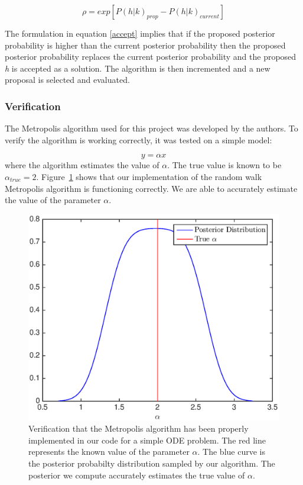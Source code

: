 \begin{equation}\label{accept}
\rho = exp[P(h|%
k)_{prop} - P(h|%
k)_{current}]
\end{equation}

The formulation in equation \ref{accept} implies that if the proposed posterior probability is higher than the current posterior probability then the proposed posterior probability replaces the current posterior probability and the proposed \textit{h} is accepted as a solution. The algorithm is then incremented and a new proposal is selected and evaluated. 


\subsubsection{Verification}
The Metropolis algorithm used for this project was developed by the authors. To verify the algorithm is working correctly, it was tested on a simple model:

\begin{equation}
y = \alpha x 
\end{equation}
where the algorithm estimates the value of $\alpha$. The true value is known to be $\alpha_{true}=2$. Figure~\ref{verifymcmc} shows that our implementation of the random walk Metropolis algorithm is functioning correctly. We are able to accurately estimate the value of the parameter $\alpha$. 

\begin{figure}[H]
\center
\includegraphics[scale=0.46]{img/MCMC-verification}
\caption{Verification that the Metropolis algorithm has been properly implemented in our code for a simple ODE problem. The red line represents the known value of the parameter $\alpha$. The blue curve is the posterior probabilty distribution sampled by our algorithm. The posterior we compute accurately estimates the true value of $\alpha$.}
\label{verifymcmc}
\end{figure}

